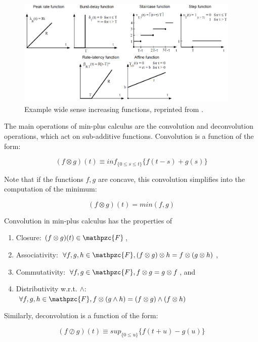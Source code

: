 \begin{figure}[htb]
  \centering
  \includegraphics[width=0.95\textwidth]{figs/wsi.png}
  \caption{Example wide sense increasing functions, reprinted from \cite{NCBook}.}
  \label{fig:wsi}
\end{figure}

The main operations of min-plus calculus are the convolution and
deconvolution operations, which act on sub-additive functions.
Convolution is a function of the form:

\begin{equation}
  (f\otimes g)(t)\equiv inf_{\{0\leq s \leq t\}}\{f(t-s)+g(s)\}
\end{equation}

Note that if the functions $f,g$ are concave, this convolution
simplifies into the computation of the minimum:

\begin{equation}
  (f\otimes g)(t)=min(f,g)
\end{equation}

Convolution in min-plus calculus has the properties of 

\begin{enumerate}
\item Closure: $(f\otimes g)(t) \in \mathpzc{F}$,
\item Associativity: $\forall f,g,h \in \mathpzc{F}, (f\otimes
  g)\otimes h = f\otimes(g\otimes h)$,
\item Commutativity: $\forall f,g \in \mathpzc{F}, f\otimes g
  = g\otimes f$, and
\item Distributivity w.r.t. $\wedge$: $\forall f,g,h \in \mathpzc{F},
  f\otimes(g\wedge h) = (f\otimes g)\wedge(f\otimes h)$
\end{enumerate}

Similarly, deconvolution is a function of the form:

\begin{equation} 
  (f\oslash g)(t)\equiv sup_{\{0\leq u\}}\{f(t+u)-g(u)\}
\end{equation}

